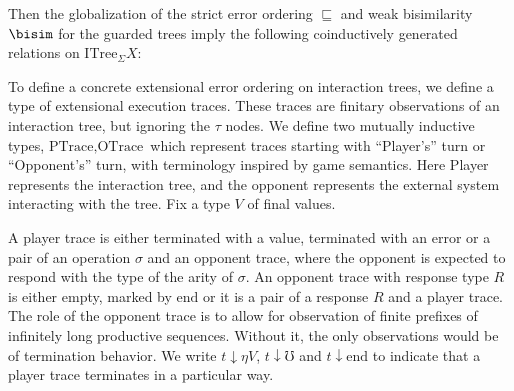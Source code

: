 \documentclass[acmsmall,screen,review,anonymous]{acmart}
\theoremstyle{remark}
\begin{document}
Then the globalization of the strict error ordering $\sqsubseteq$ and weak
bisimilarity $\bisim$ for the guarded trees imply the following coinductively generated
relations on $\textrm{ITree}_\Sigma X$:
%
\begin{mathpar}
  \footnotesize



\end{mathpar}

%
To define a concrete extensional error ordering on interaction trees, we define
a type of extensional execution traces. These traces are finitary observations of
an interaction tree, but ignoring the $\tau$ nodes.
%
We define two mutually inductive types, $\textrm{PTrace}, \textrm{OTrace}$ which
represent traces starting with ``Player's'' turn or ``Opponent's'' turn, with
terminology inspired by game semantics. Here Player represents the interaction
tree, and the opponent represents the external system interacting with the tree.
Fix a type $V$ of final values.
A player trace is either terminated with a value, terminated with an error or a
pair of an operation $\sigma$ and an opponent trace, where the opponent is
expected to respond with the type of the arity of $\sigma$. An opponent trace
with response type $R$ is either empty, marked by $\textrm{end}$ or it is a pair
of a response $R$ and a player trace. The role of the opponent trace is to allow
for observation of finite prefixes of infinitely long productive sequences.
Without it, the only observations would be of termination behavior.
%
We write $t \downarrow \eta V$, $t \downarrow \mho$ and $t \downarrow
\textrm{end}$ to indicate that a player trace terminates in a particular way.
\end{document}
